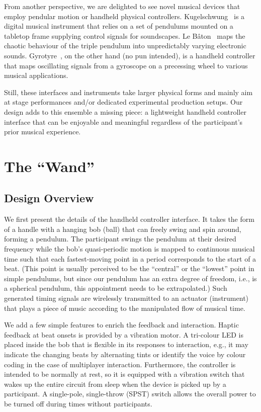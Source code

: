 \documentclass{nime-alternate} %
\begin{document}
From another perspective, we are delighted to see novel musical devices that employ pendular motion or handheld physical controllers. Kugelschwung~\cite{Kugelschwung} is a digital musical instrument that relies on a set of pendulums mounted on a tabletop frame supplying control signals for soundscapes. Le Bâton~\cite{LeBaton} maps the chaotic behaviour of the triple pendulum into unpredictably varying electronic sounds. Gyrotyre~\cite{Gyrotyre}, on the other hand (no pun intended), is a handheld controller that maps oscillating signals from a gyroscope on a precessing wheel to various musical applications.

Still, these interfaces and instruments take larger physical forms and mainly aim at stage performances and/or dedicated experimental production setups. Our design adds to this ensemble a missing piece: a lightweight handheld controller interface that can be enjoyable and meaningful regardless of the participant's prior musical experience.

\section{The ``Wand''}

\subsection{Design Overview}
We first present the details of the handheld controller interface. It takes the form of a handle with a hanging bob (ball) that can freely swing and spin around, forming a pendulum. The participant swings the pendulum at their desired frequency while the bob's quasi-periodic motion is mapped to continuous musical time such that each fastest-moving point in a period corresponds to the start of a beat. (This point is usually perceived to be the ``central'' or the ``lowest'' point in simple pendulums, but since our pendulum has an extra degree of freedom, i.e., is a spherical pendulum, this appointment needs to be extrapolated.) Such generated timing signals are wirelessly transmitted to an actuator (instrument) that plays a piece of music according to the manipulated flow of musical time.

We add a few simple features to enrich the feedback and interaction. Haptic feedback at beat onsets is provided by a vibration motor. A tri-colour LED is placed inside the bob that is flexible in its responses to interaction, e.g., it may indicate the changing beats by alternating tints or identify the voice by colour coding in the case of multiplayer interaction. Furthermore, the controller is intended to be normally at rest, so it is equipped with a vibration switch that wakes up the entire circuit from sleep when the device is picked up by a participant. A single-pole, single-throw (SPST) switch allows the overall power to be turned off during times without participants.
\end{document}
